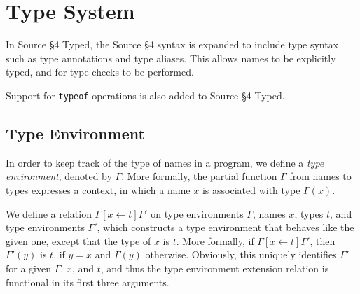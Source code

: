 \newcommand{\Rule}[2]{\genfrac{}{}{0.7pt}{}{{\setlength{\fboxrule}{0pt}\setlength{\fboxsep}{3mm}\fbox{$#1$}}}{{\setlength{\fboxrule}{0pt}\setlength{\fboxsep}{3mm}\fbox{$#2$}}}}

\newcommand{\TruE}{\textbf{\texttt{true}}}
\newcommand{\FalsE}{\textbf{\texttt{false}}}
\newcommand{\AndOp}{\texttt{\&\&}}
\newcommand{\OrOp}{\texttt{||}}
\newcommand{\ThenOp}{\texttt{?}}
\newcommand{\ElseOp}{\texttt{:}}
\newcommand{\Rc}{\texttt{\}}}
\newcommand{\Lc}{\texttt{\{}}
\newcommand{\Rp}{\texttt{)}}
\newcommand{\Lp}{\texttt{(}}
\newcommand{\Fun}{\textbf{\texttt{function}}}
\newcommand{\Let}{\textbf{\texttt{let}}}
\newcommand{\Return}{\textbf{\texttt{return}}}
\newcommand{\Const}{\textbf{\texttt{const}}}
\newcommand{\If}{\textbf{\texttt{if}}}
\newcommand{\Else}{\textbf{\texttt{else}}}
\newcommand{\Bool}{\texttt{boolean}}
\newcommand{\Number}{\texttt{number}}
\newcommand{\String}{\texttt{string}}
\newcommand{\Undefined}{\texttt{undefined}}
\newcommand{\Null}{\texttt{null}}
\newcommand{\Any}{\texttt{any}}
\newcommand{\Void}{\texttt{void}}
\newcommand{\Pred}{\textit{Pred}}
\newcommand{\type}{\textit{type}}
\newcommand{\polytype}{\textit{polytype}}
\newcommand{\predtype}{\textit{predtype}}
\newcommand{\ExtractPos}{\ensuremath{\textit{Extract}^+}}
\newcommand{\ExtractNeg}{\ensuremath{\textit{Extract}^-}}

\newtheorem{definition}{Definition}[section]

\section{Type System}  

In Source \S 4 Typed, the Source \S 4 syntax is expanded to include type syntax such as type annotations and type aliases.
This allows names to be explicitly typed, and for type checks to be performed.

Support for \texttt{typeof} operations is also added to Source \S 4 Typed.

\subsection{Type Environment}

In order to keep track of the type of names in a program, we define a
\emph{type environment}, denoted by $\Gamma$. More formally,
the partial function $\Gamma$ from names to types expresses a 
context, in which a name $x$ is associated with type $\Gamma(x)$. 

We define a relation $\Gamma[x \leftarrow t]\Gamma'$ on type environments 
$\Gamma$, names $x$, types $t$, and type environments $\Gamma'$,
which constructs a type environment that behaves like the 
given one, except that the type of $x$ is $t$. More formally, 
if $\Gamma[x \leftarrow t]\Gamma'$, then $\Gamma'(y)$ is $t$, 
if $y=x$ and $\Gamma(y)$ 
otherwise. Obviously, this uniquely identifies $\Gamma'$ for
a given $\Gamma$, $x$, and $t$, and thus the type environment extension
relation is functional in its first three arguments.

